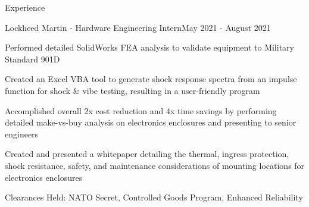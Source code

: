 \documentclass{resume} %
\begin{document}
\begin{rSection}{Experience}
\begin{comment}
\end{comment}

\begin{rSubsection}{Lockheed Martin - Hardware Engineering Intern}{May 2021 - August 2021}{}{}

\item Performed detailed SolidWorks FEA analysis to validate equipment to Military Standard 901D
\item Created an Excel VBA tool to generate shock response spectra from an impulse function for shock \& vibe testing, resulting in a user-friendly program
\item Accomplished overall 2x cost reduction and 4x time savings by performing detailed make-vs-buy analysis on electronics enclosures and presenting to senior engineers
\item Created and presented a whitepaper detailing the thermal, ingress protection, shock resistance, safety, and maintenance considerations of mounting locations for electronics enclosures
\item Clearances Held: NATO Secret, Controlled Goods Program, Enhanced Reliability

\end{rSubsection}

\begin{comment}
\begin{rSubsection}{Department of National Defense - Engineering Intern}{May 2020 - September 2020}{}{}

\item Documented and presented key specifications on armored patrol vehicles for 411 vehicles in 69 variants
\item Reworked procurement documents based on technical requirements from multiple military bases
\item Proofread english-to-french translations of contracts to ensure correctness

\end{rSubsection}
\end{comment}
\end{rSection}
\end{document}
